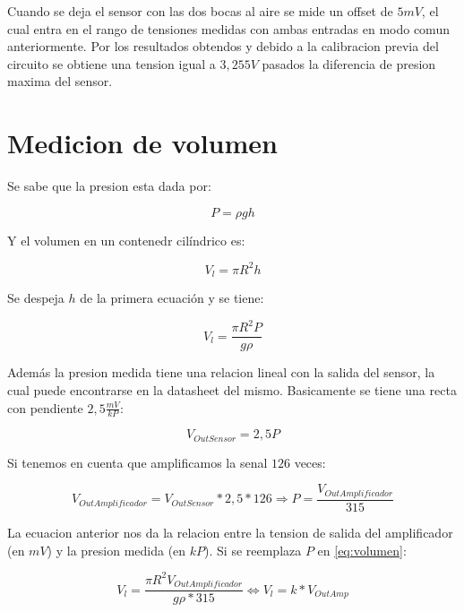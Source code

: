 \documentclass[a4paper]{article}
\begin{document}
Cuando se deja el sensor con las dos bocas al aire se mide un offset de $5mV$, el cual entra en el rango de tensiones medidas con ambas entradas en modo comun anteriormente. Por los resultados obtendos y debido a la calibracion previa del circuito se obtiene una tension igual a $3,255V$ pasados la diferencia de presion maxima del sensor. 


\section{Medicion de volumen}

Se sabe que la presion esta dada por:

\begin{equation}
P = \rho gh 
\end{equation}

Y el volumen en un contenedr cil\'indrico es:
 
\begin{equation}
V_l = \pi R^2h 
\end{equation}

Se despeja $h$ de la primera ecuaci\'on y se tiene:

\begin{equation}\label{eq:volumen}
V_l = \frac{\pi R^2P}{g\rho}
\end{equation} 

Adem\'as la presion medida tiene una relacion lineal con la salida del sensor, la cual puede encontrarse en la datasheet del mismo. Basicamente se tiene una recta con pendiente $2,5\frac{mV}{kP}$:

\begin{equation}
V_{OutSensor} = 2,5P
\end{equation}

Si tenemos en cuenta que amplificamos la senal $126$ veces:

\begin{equation}
V_{OutAmplificador} = V_{OutSensor}*2,5*126 \Longrightarrow P = \frac{V_{OutAmplificador}}{315}
\end{equation}

La ecuacion anterior nos da la relacion entre la tension de salida del amplificador (en $mV$) y la presion medida (en $kP$). Si se reemplaza $P$ en \ref{eq:volumen}:

\begin{equation}
V_l = \frac{\pi R^2V_{OutAmplificador}}{g\rho*315} \Longleftrightarrow V_l = k*V_{OutAmp}
\end{equation} 
\end{document}
